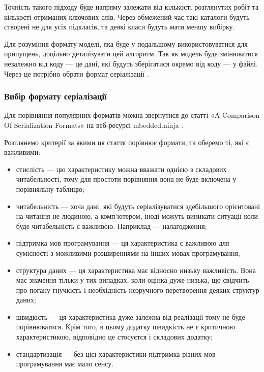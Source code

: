 \documentclass[14pt]{extarticle}
\begin{document}
  Точність такого підходу буде напряму залежати від кількості розглянутих робіт
  та кількості отриманих ключових слів.
  Через обмежений час такі каталоги будуть створені не для усіх підкласів,
  та деякі класи будуть мати меншу вибірку.

  Для розуміння формату моделі,
  яка буде у подальшому використовуватися для припущень,
  доцільно деталізувати цей алгоритм.
  Так як модель буде змінюватися незалежно від коду --- це дані,
  які будуть зберігатися окремо від коду --- у файлі.
  Через це потрібно обрати формат серіалізації
  \cite{wiki_serialization,wiki_serialization_comparison}.

  \subsubsection{Вибір формату серіалізації}

  Для порівняння популярних форматів можна звернутися до статті
  «A Comparison Of Serialization Formats»
  \cite{mbedded_ninja_serialization_comparison} на веб-ресурсі mbedded.ninja
  \cite{mbedded_ninja}.

  Розглянемо критерії за якими ця стаття порівнює формати, та оберемо ті,
  які є важливими:

  \begin{itemize}[labelindent=\dimexpr{}\relax, leftmargin=*]
    \item стислість --- цю характеристику можна вважати однією з складових
      читабельності,
      тому для простоти порівняння вона не буде включена у порівняльну таблицю;
    \item читабельність --- хоча дані,
      які будуть серіалізуватися здебільшого орієнтовані на читання не людиною,
      а комп'ютером,
      іноді можуть виникати ситуації коли буде читабельність є важливою.
      Наприклад --- налагодження;
    \item підтримка мов програмування --- ця характеристика є важливою
      для сумісності \cite{wiki_interop}
      з можливими розширеннями на інших мовах програмування;
    \item структура даних --- ця характеристика має відносно низьку важливість.
      Вона має значення тільки у тих випадках, коли оцінка дуже низька,
      що свідчить про погану гнучкість
      і необхідність незручного перетворення деяких структур даних;
    \item швидкість --- ця характеристика дуже залежна від реалізації
      тому не буде порівнюватися.
      Крім того, в цьому додатку швидкість не є критичною характеристикою,
      відповідно це стосуєтся і складових додатку;
    \item стандартизація --- без цієї характеристики
      підтримка різних мов програмування має мало сенсу.
  \end{itemize}
\end{document}
